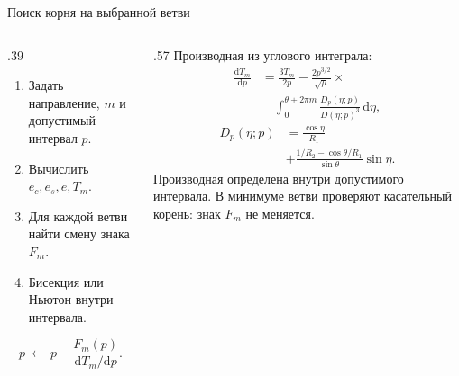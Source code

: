 \documentclass[11pt,aspectratio=169,t]{beamer}
\newcommand{\eqcompact}{\fontsize{10}{12}\selectfont}
\newcommand{\derivationmathspacing}{%
  \setlength{\abovedisplayskip}{2pt}%
  \setlength{\belowdisplayskip}{3pt}%
  \setlength{\abovedisplayshortskip}{2pt}%
  \setlength{\belowdisplayshortskip}{2pt}%
  \setlength{\jot}{2pt}}
\begin{document}
\begin{frame}{Поиск корня на выбранной ветви}
\relax\derivationmathspacing
\begin{columns}[T,onlytextwidth]
\begin{column}{.39\textwidth}
\begin{enumerate}
\setlength{\itemsep}{3pt}
\item Задать направление, $m$ и допустимый интервал $p$.
\item Вычислить $e_c,e_s,e,T_m$.
\item Для каждой ветви найти смену знака $F_m$.
\item Бисекция или Ньютон внутри интервала.
\end{enumerate}
{\eqcompact\derivationmathspacing
\[
 p\ \leftarrow\ p-\frac{F_m(p)}{\mathrm dT_m/\mathrm dp}.
\]
}
\end{column}
\begin{column}{.57\textwidth}
Производная из углового интеграла:
{\eqcompact\derivationmathspacing
\[
 \begin{aligned}
 \frac{\mathrm dT_m}{\mathrm dp}
 &=\frac{3T_m}{2p}
 -\frac{2p^{3/2}}{\sqrt\mu}\times\\[3pt]
 &\quad\int_0^{\theta+2\pi m}
 \frac{D_p(\eta;p)}{D(\eta;p)^3}\,\mathrm d\eta,
 \end{aligned}
\]
\[
 \begin{aligned}
 D_p(\eta;p)&=\frac{\cos\eta}{R_1}\\[3pt]
 &+\frac{1/R_2-\cos\theta/R_1}{\sin\theta}\sin\eta.
 \end{aligned}
\]
}
\justifying
Производная определена внутри допустимого интервала.
В минимуме ветви проверяют касательный корень: знак $F_m$ не меняется.
\end{column}
\end{columns}
\end{frame}
\end{document}
